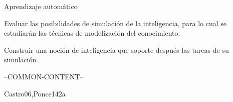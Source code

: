 \begin{syllabus}


\begin{justification}
Aprendizaje automático
\end{justification}

\begin{goals}
    \item Evaluar las posibilidades de simulación de la inteligencia, para lo cual se estudiarán las técnicas de modelización del conocimiento.
    \item Construir una noción de inteligencia que soporte después las tareas de su simulación.
\end{goals}

--COMMON-CONTENT--

\begin{unit}{\ISFundamentalIssues}{}{Castro06,Ponce14}{2}{a}
    \begin{topics}
        \item \ISFundamentalIssuesTopicOverview
        \item \ISFundamentalIssuesTopicWhat
        \item \ISFundamentalIssuesTopicProblem
        \item \ISFundamentalIssuesTopicNature
        \item \ISFundamentalIssuesTopicPhilosophical
    \end{topics}
    \begin{learningoutcomes}
        \item \ISFundamentalIssuesLODescribeTuring [\Usage]
        \item \ISFundamentalIssuesLODeterming [\Usage]
    \end{learningoutcomes}
\end{unit}


\end{syllabus}
